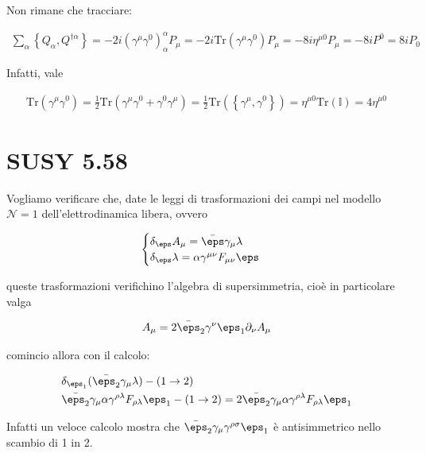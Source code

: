 \documentclass{report}
\begin{document}
Non rimane che tracciare: 

\begin{align}
    \sum_\alpha \left\{ Q_\alpha, Q^{\dagger \alpha} \right\} = -2i (\gamma^\mu \gamma^0)^\alpha_\alpha P_\mu = -2i \text{Tr}(\gamma^\mu \gamma^0)P_\mu = -8i \eta^{\mu0} P_\mu = -8iP^0 = 8iP_0
\end{align}

Infatti, vale 

\begin{align}
    \text{Tr}(\gamma^\mu \gamma^0) = \frac{1}{2}\text{Tr}(\gamma^\mu \gamma^0 + \gamma^0 \gamma^\mu) = \frac{1}{2}\text{Tr}(\left\{ \gamma^\mu, \gamma^0 \right\}) = \eta^{\mu0}\text{Tr}(\mathbb{I}) = 4\eta^{\mu0}
\end{align}

\section{SUSY 5.58}

Vogliamo verificare che, date le leggi di trasformazioni dei campi nel modello \(\mathcal{N}=1\) dell'elettrodinamica libera, ovvero 

\begin{align}
    \begin{cases}
        \delta_\eps A_\mu = \bar{\eps} \gamma_\mu \lambda \\ 
        \delta_\eps \lambda = \alpha \gamma^{\mu\nu}F_{\mu\nu} \eps 
    \end{cases}
\end{align}

queste trasformazioni verifichino l'algebra di supersimmetria, cioè in particolare valga 

\begin{align}
    [\delta_{\eps_1}, \delta_{\eps_2}]A_\mu = 2\bar{\eps}_2 \gamma^\nu \eps_1 \partial_\nu A_\mu
\end{align}

comincio allora con il calcolo: 

\begin{align}
    &\delta_{\eps_1}(\bar{\eps_2}\gamma_\mu \lambda) - (1 \to 2) \notag \\ 
    &\bar{\eps_2}\gamma_\mu \alpha \gamma^{\rho\lambda}F_{\rho\lambda} \eps_1 - (1\to 2) = 2\bar{\eps_2}\gamma_\mu \alpha \gamma^{\rho\lambda}F_{\rho\lambda} \eps_1
\end{align}

Infatti un veloce calcolo mostra che \(\bar{\eps}_2 \gamma_\mu \gamma^{\rho\sigma}\eps_1\) è antisimmetrico nello scambio di 1 in 2. 
\end{document}

